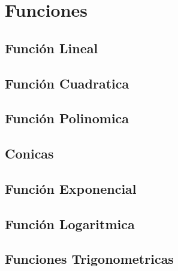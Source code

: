 
\section{Funciones}


\subsection{Función Lineal}
\subsection{Función Cuadratica}
\subsection{Función Polinomica}
\subsection{Conicas}
\subsection{Función Exponencial}
\subsection{Función Logaritmica}
\subsection{Funciones Trigonometricas}

